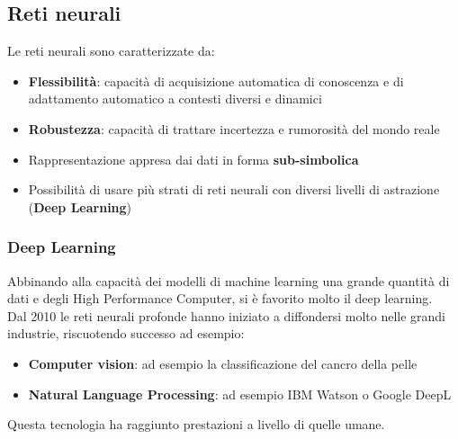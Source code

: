 \subsection{Reti neurali}
Le reti neurali sono caratterizzate da:
\begin{itemize}
	\item \textbf{Flessibilità}: capacità di acquisizione automatica di conoscenza e di adattamento automatico a contesti diversi e dinamici
	\item \textbf{Robustezza}: capacità di trattare incertezza e rumorosità del mondo reale
	\item Rappresentazione appresa dai dati in forma \textbf{sub-simbolica}
	\item Possibilità di usare più strati di reti neurali con diversi livelli di astrazione (\textbf{Deep Learning})
\end{itemize}

\subsubsection{Deep Learning}
Abbinando alla capacità dei modelli di machine learning una grande quantità di dati e degli High Performance Computer, si è favorito molto il deep learning.\\
Dal 2010 le reti neurali profonde hanno iniziato a diffondersi molto nelle grandi industrie, riscuotendo successo ad esempio:
\begin{itemize}
	\item \textbf{Computer vision}: ad esempio la classificazione del cancro della pelle
	\item \textbf{Natural Language Processing}: ad esempio IBM Watson o Google DeepL
\end{itemize}
Questa tecnologia ha raggiunto prestazioni a livello di quelle umane.